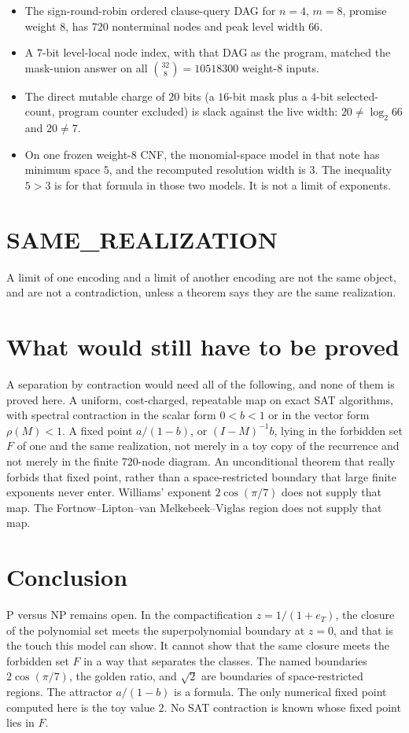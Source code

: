 \documentclass{article}
\begin{document}
\begin{itemize}
\item The sign-round-robin ordered clause-query DAG for \(n=4\), \(m=8\), promise weight \(8\), has \(720\) nonterminal nodes and peak level width \(66\).
\item A \(7\)-bit level-local node index, with that DAG as the program, matched the mask-union answer on all \(\binom{32}{8}=10518300\) weight-\(8\) inputs.
\item The direct mutable charge of \(20\) bits (a \(16\)-bit mask plus a \(4\)-bit selected-count, program counter excluded) is slack against the live width: \(20\neq\log_2 66\) and \(20\neq 7\).
\item On one frozen weight-\(8\) CNF, the monomial-space model in that note has minimum space \(5\), and the recomputed resolution width is \(3\).
The inequality \(5>3\) is for that formula in those two models.
It is not a limit of exponents.
\end{itemize}

\section{SAME\_REALIZATION}
A limit of one encoding and a limit of another encoding are not the same object, and are not a contradiction, unless a theorem says they are the same realization.

\section{What would still have to be proved}
A separation by contraction would need all of the following, and none of them is proved here.
A uniform, cost-charged, repeatable map on exact SAT algorithms, with spectral contraction in the scalar form \(0<b<1\) or in the vector form \(\rho(M)<1\).
A fixed point \(a/(1-b)\), or \((I-M)^{-1}b\), lying in the forbidden set \(F\) of one and the same realization, not merely in a toy copy of the recurrence and not merely in the finite \(720\)-node diagram.
An unconditional theorem that really forbids that fixed point, rather than a space-restricted boundary that large finite exponents never enter.
Williams' exponent \(2\cos(\pi/7)\) does not supply that map.
The Fortnow--Lipton--van Melkebeek--Viglas region does not supply that map.

\section{Conclusion}
P versus NP remains open.
In the compactification \(z=1/(1+e_T)\), the closure of the polynomial set meets the superpolynomial boundary at \(z=0\), and that is the touch this model can show.
It cannot show that the same closure meets the forbidden set \(F\) in a way that separates the classes.
The named boundaries \(2\cos(\pi/7)\), the golden ratio, and \(\sqrt{2}\) are boundaries of space-restricted regions.
The attractor \(a/(1-b)\) is a formula.
The only numerical fixed point computed here is the toy value \(2\).
No SAT contraction is known whose fixed point lies in \(F\).
\end{document}
